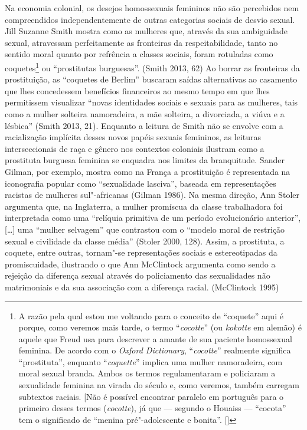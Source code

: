 Na economia colonial, os desejos homossexuais femininos não são
percebidos nem compreendidos independentemente de outras categorias
sociais de desvio sexual. Jill Suzanne Smith mostra como as mulheres
que, através da sua ambiguidade sexual, atravessam perfeitamente as
fronteiras da respeitabilidade, tanto no sentido moral quanto por
refrência a classes sociais, foram rotuladas como coquetes\footnote{A
  razão pela qual estou me voltando para o conceito de ``coquete'' aqui é
  porque, como veremos mais tarde, o termo ``\emph{cocotte}'' (ou
  \emph{kokotte} em alemão) é aquele que Freud usa para descrever a
  amante de sua paciente homossexual feminina. De acordo com o
  \emph{Oxford Dictionary}, ``\emph{cocotte}'' realmente significa
  ``prostituta'', enquanto ``\emph{coquette}'' implica uma mulher
  namoradeira, com moral sexual branda. Ambos os termos regulamentaram e
  policiaram a sexualidade feminina na virada do século e, como veremos,
  também carregam subtextos raciais. {[}Não é possível encontrar
  paralelo em português para o primeiro desses termos (\emph{cocotte}),
  já que --- segundo o Houaiss --- ``cocota'' tem o significado de
  ``menina pré"-adolescente e bonita''. []} ou ``prostitutas
    burguesas''. (Smith 2013, 62) Ao borrar as fronteiras da prostituição, as
``coquetes de Berlim'' buscaram saídas alternativas ao casamento que lhes
concedessem benefícios financeiros ao mesmo tempo em que lhes
permitissem visualizar ``novas identidades sociais e sexuais para as
mulheres, tais como a mulher solteira namoradeira, a mãe solteira, a
divorciada, a viúva e a lésbica'' (Smith 2013, 21). Enquanto a leitura de
Smith não se envolve com a racialização implícita desses novos papéis
sexuais femininos, as leituras interseccionais de raça e gênero nos
contextos coloniais ilustram como a prostituta burguesa feminina se
enquadra nos limites da branquitude. Sander Gilman, por exemplo, mostra
como na França a prostituição é representada na iconografia popular como
``sexualidade lasciva'', baseada em representações racistas de mulheres
sul"-africanas (Gilman 1986). Na mesma direção, Ann Stoler argumenta que,
na Inglaterra, a mulher promíscua da classe trabalhadora foi
interpretada como uma ``relíquia primitiva de um período evolucionário
anterior'', {[}\ldots{}{]} uma ``mulher selvagem'' que contrastou com o ``modelo
moral de restrição sexual e civilidade da classe média'' (Stoler 2000,
128). Assim, a prostituta, a coquete, entre outras, tornam"-se
representações sociais e estereotipadas da promiscuidade, ilustrando o
que Ann McClintock argumenta como sendo a rejeição da diferença sexual
através do policiamento das sexualidades não matrimoniais e da sua
associação com a diferença racial. (McClintock 1995)

